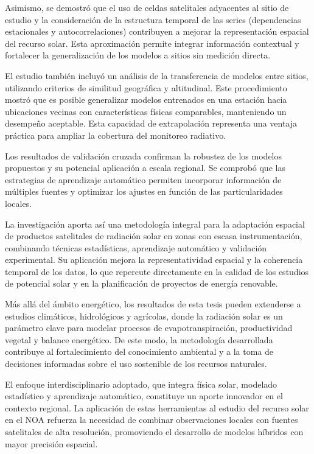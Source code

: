 \documentclass[letterpaper,12pt, twoside]{report}
\providecommand{\DIFdeltex}[1]{{\protect\color{red} \scriptsize #1}} %
\providecommand{\DIFdel}[1]{\texorpdfstring{\DIFdeltex{#1}}{}} %
\begin{document}
\DIFdel{Asimismo, se demostró que el uso de celdas satelitales adyacentes al sitio de estudio y la consideración de la estructura temporal de las series (dependencias estacionales y autocorrelaciones) contribuyen a mejorar la representación espacial del recurso solar. Esta aproximación permite integrar información contextual y fortalecer la generalización de los modelos a sitios sin medición directa.
}%

\DIFdel{El estudio también incluyó un análisis de la transferencia de modelos entre sitios, utilizando criterios de similitud geográfica y altitudinal. Este procedimiento mostró que es posible generalizar modelos entrenados en una estación hacia ubicaciones vecinas con características físicas comparables, manteniendo un desempeño aceptable. Esta capacidad de extrapolación representa una ventaja práctica para ampliar la cobertura del monitoreo radiativo.
}%

\DIFdel{Los resultados de validación cruzada confirman la robustez de los modelos propuestos y su potencial aplicación a escala regional. Se comprobó que las estrategias de aprendizaje automático permiten incorporar información de múltiples fuentes y optimizar los ajustes en función de las particularidades locales.
}%

\DIFdel{La investigación aporta así una metodología integral para la adaptación espacial de productos satelitales de radiación solar en zonas con escasa instrumentación, combinando técnicas estadísticas, aprendizaje automático y validación experimental. Su aplicación mejora la representatividad espacial y la coherencia temporal de los datos, lo que repercute directamente en la calidad de los estudios de potencial solar y en la planificación de proyectos de energía renovable.
}%

\DIFdel{Más allá del ámbito energético, los resultados de esta tesis pueden extenderse a estudios climáticos, hidrológicos y agrícolas, donde la radiación solar es un parámetro clave para modelar procesos de evapotranspiración, productividad vegetal y balance energético. De este modo, la metodología desarrollada contribuye al fortalecimiento del conocimiento ambiental y a la toma de decisiones informadas sobre el uso sostenible de los recursos naturales.
}%

\DIFdel{El enfoque interdisciplinario adoptado, que integra física solar, modelado estadístico y aprendizaje automático, constituye un aporte innovador en el contexto regional. La aplicación de estas herramientas al estudio del recurso solar en el NOA refuerza la necesidad de combinar observaciones locales con fuentes satelitales de alta resolución, promoviendo el desarrollo de modelos híbridos con mayor precisión espacial.
}%
\end{document}
